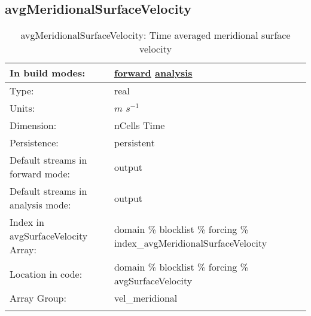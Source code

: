 \subsection[avgMeridionalSurfaceVelocity]{avgMeridionalSurfaceVelocity}
\label{subsec:var_sec_forcing_avgMeridionalSurfaceVelocity}
\begin{center}
\begin{longtable}{| p{2.0in} | p{4.0in} |}
        \hline 
        In build modes: & \hyperref[subsec:forward_var_tab_forcing]{forward} \hyperref[subsec:analysis_var_tab_forcing]{analysis} \\
        \hline 
        Type: & real \\
        \hline 
        Units: & $m$ $s^{-1}$ \\
        \hline 
        Dimension: & nCells Time \\
        \hline 
        Persistence: & persistent \\
        \hline 
		 Default streams in forward mode: &  output \\
        \hline 
		 Default streams in analysis mode: &  output \\
        \hline 
		 Index in avgSurfaceVelocity Array: & domain \% blocklist \% forcing \% index\_avgMeridionalSurfaceVelocity \\
		 \hline 
		 Location in code: & domain \% blocklist \% forcing \% avgSurfaceVelocity \\
		 \hline 
		 Array Group: & vel\_meridional \\
		 \hline 
    \caption{avgMeridionalSurfaceVelocity: Time averaged meridional surface velocity}
\end{longtable}
\end{center}
